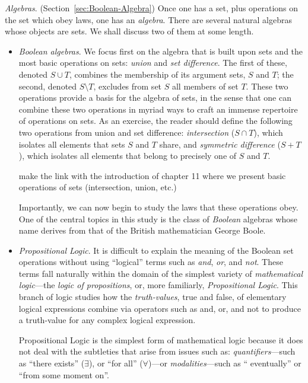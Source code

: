 {\it Algebras}.  (Section~\ref{sec:Boolean-Algebra})
 Once one has a set, plus
operations on the set which obey laws, one has an {\it algebra}.
 There are several natural algebras whose
objects are sets.  We shall discuss two of them at some length.
\begin{itemize}
\item
{\it Boolean algebras}.  We focus first on the algebra that is built
upon sets and the most basic operations on sets: {\it union} and {\it
  set difference}.  The first of these, denoted $S \cup T$, combines
the membership of its argument sets, $S$ and $T$; the second, denoted
$S \setminus T$, excludes from set $S$ all members of set $T$.  These
two operations provide a basis for the algebra of sets, in the sense
that one can combine these two operations in myriad ways to craft an
immense repertoire of operations on sets.  As an exercise, the reader
should define the following two operations from union and set
difference: {\it intersection} ($S \cap T$), which isolates all
elements that sets $S$ and $T$ share, and {\it symmetric difference}
($S+T$), which isolates all elements that belong to precisely one of
$S$ and $T$.

{\Denis make the link with the introduction of chapter 11 where we present basic operations of sets
(intersection, union, etc.)}

Importantly, we can now begin to study the laws that these operations
obey.  One of the central topics in this study is the class of {\it
  Boolean} algebras  whose name
derives from that of the British mathematician George
Boole. 

\item
{\it Propositional Logic}.  
It is difficult to explain the meaning of the Boolean set operations
without using ``logical'' terms such as {\it and}, {\it or}, and {\it
  not}.  These terms fall naturally within the domain of the simplest
variety of {\it mathematical logic}---the {\it logic of propositions},
or, more familiarly, {\it Propositional Logic}.  This branch of logic
studies how the {\em truth-values}, {\sc true} and {\sc false}, of
elementary logical expressions combine via operators such as {\sc
  and}, {\sc or}, and {\sc not} to produce a truth-value for any
complex logical expression.

Propositional Logic is the simplest form of mathematical logic because
it does not deal with the subtleties that arise from issues such as:
{\it quantifiers}---such as ``{\sc there exists}'' ($\exists$), or
``{\sc for all}'' ($\forall$)---or {\it modalities}---such as ``{\sc
  eventually}'' or ``{\sc from some moment on}''.


\end{itemize}
